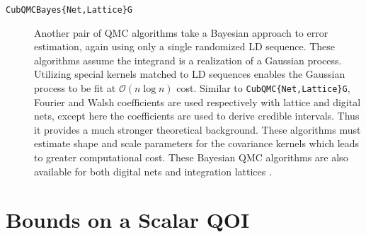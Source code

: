 \documentclass[graybox]{svmult}
\begin{document}
\begin{description}
    \item[\texttt{CubQMCBayes\{Net,Lattice\}G}] Another pair of QMC algorithms take a Bayesian approach to error estimation, again using only a single randomized LD sequence. These algorithms assume the integrand is a realization of a Gaussian process. Utilizing special kernels matched to LD sequences enables the Gaussian process to be fit at $\mathcal{O}(n \log n)$ cost. Similar to \texttt{CubQMC\{Net,Lattice\}G}, Fourier and Walsh coefficients are used respectively with lattice and digital nets, except here the coefficients are used to derive credible intervals. Thus it provides a much stronger theoretical background. These algorithms must estimate shape and scale parameters for the covariance kernels which leads to greater computational cost. These Bayesian QMC algorithms \cite{cubqmcbayes_thesis} are also available for both digital nets \cite{cubqmcbayessobol} and integration lattices  \cite{cubqmcbayeslattice}. 
\end{description}


\section{Bounds on a Scalar QOI} \label{SoRa_sec:comb_sol_approx}
\end{document}
